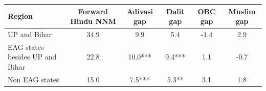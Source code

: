\begin{tabular}{lccccc}
\hline
Region & Forward Hindu NNM & Adivasi gap & Dalit gap & OBC gap & Muslim gap \\
\hline
UP and Bihar&34.9&9.9&5.4&-1.4&2.9\\
EAG states besides UP and Bihar&22.8&10.0***&9.4***&1.1&-0.7\\
Non EAG states&15.0&7.5***&5.3**&3.1&1.8\\
\hline
\end{tabular}
